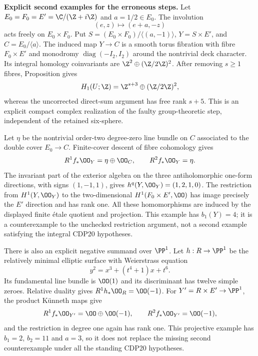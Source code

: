 \begin{proposition}[Refuted]\hypertarget{tag-01G3}{}\label{cdp:st:D.1.5}


\textbf{Explicit second examples for the erroneous steps.}
Let $E_0=F_0=E'=\C/(\Z+i\Z)$ and $a=1/2\in E_0$.
The involution
\[
(e,z)\longmapsto(e+a,-z)
\]
acts freely on $E_0\times F_0$. Put
$S=(E_0\times F_0)/\langle(a,-1)\rangle$,
$Y=S\times E'$, and $C=E_0/\langle a\rangle$.
The induced map $Y\to C$ is a smooth torus fibration with fibre
$F_0\times E'$ and monodromy
$\operatorname{diag}(-I_2,I_2)$ around the nontrivial deck character.
Its integral homology coinvariants are
$\Z^2\oplus(\Z/2\Z)^2$. After removing $s\geq1$ fibres,
Proposition  gives
\[
H_1(U;\Z)=\Z^{s+3}\oplus(\Z/2\Z)^2,
\]
whereas the uncorrected direct-sum argument has free rank $s+5$.
This is an explicit compact complex realization of the faulty
group-theoretic step, independent of the retained six-sphere.

Let $\eta$ be the nontrivial order-two degree-zero line bundle on
$C$ associated to the double cover $E_0\to C$. Finite-cover descent
of fibre cohomology gives
\[
R^1f_*\OO_Y=\eta\oplus\OO_C,\qquad R^2f_*\OO_Y=\eta.
\]
The invariant part of the exterior algebra on the three
antiholomorphic one-form directions, with signs $(1,-1,1)$,
gives $h^q(Y,\OO_Y)=(1,2,1,0)$. The restriction from
$H^1(Y,\OO_Y)$ to the two-dimensional $H^1(F_0\times E',\OO)$
has image precisely the $E'$ direction and has rank one.
All these homomorphisms are induced by the displayed finite
\'etale quotient and projection. This example has $b_1(Y)=4$;
it is a counterexample to the unchecked restriction argument, not
a second example satisfying the integral CDP20 hypotheses.

There is also an explicit negative summand over $\PP^1$. Let
$h:R\to\PP^1$ be the relatively minimal elliptic surface with
Weierstrass equation
\[
y^2=x^3+(t^4+1)x+t^6.
\]
Its fundamental line bundle is $\OO(1)$ and its discriminant has
twelve simple zeroes. Relative duality gives
$R^1h_*\OO_R=\OO(-1)$. For $Y'=R\times E'\to\PP^1$,
the product K\"unneth maps give
\[
R^1f_*\OO_{Y'}=\OO\oplus\OO(-1),\qquad
R^2f_*\OO_{Y'}=\OO(-1),
\]
and the restriction in degree one again has rank one. This
projective example has $b_1=2$, $b_2=11$ and $a=3$, so it does not
replace the missing second counterexample under all the standing
CDP20 hypotheses.
\end{proposition}